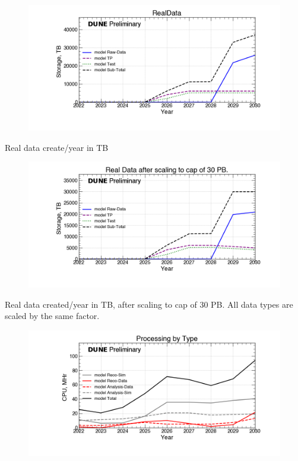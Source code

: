 
\begin{figure}[ht]
\centering\includegraphics[height=0.4\textwidth]{NearTerm_2024-08-14-2030_noMWC_RealData-Storage.png}\end{figure}
\begin{table}[h]
\label{tab:realdata}
\caption{Real data create/year in TB}
\end{table}
\pagebreak
\begin{figure}[ht]
\centering\includegraphics[height=0.4\textwidth]{NearTerm_2024-08-14-2030_noMWC_Real-Data-after-scaling-to-cap-of-30-PB.-Storage.png}\end{figure}
\begin{table}[h]
\label{tab:realdataCapped}
\caption{Real data created/year in TB, after scaling to cap of 30 PB.  All data types are scaled by the same factor. }
\end{table}
\pagebreak
\begin{figure}[ht]
\centering\includegraphics[height=0.4\textwidth]{NearTerm_2024-08-14-2030_noMWC_Processing-by-Type-CPU.png}\end{figure}
